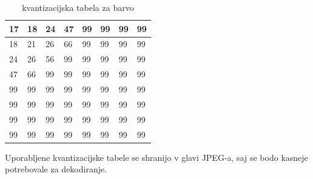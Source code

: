 \documentclass[a4paper,12pt,openright]{book}
\begin{document}
\begin{table}[ht]
\centering
\begin{tabular}{|p{18pt}|p{18pt}|p{18pt}|p{18pt}|p{18pt}|p{18pt}|p{18pt}|p{18pt}|}
\hline
17& 18& 24& 47& 99& 99& 99& 99 \\ \hline
18& 21& 26& 66& 99& 99& 99& 99 \\ \hline
24& 26& 56& 99& 99& 99& 99& 99 \\ \hline
47& 66& 99& 99& 99& 99& 99& 99 \\ \hline
99& 99& 99& 99& 99& 99& 99& 99 \\ \hline
99& 99& 99& 99& 99& 99& 99& 99 \\ \hline
99& 99& 99& 99& 99& 99& 99& 99 \\ \hline
99& 99& 99& 99& 99& 99& 99& 99 \\ \hline
\end{tabular}
\caption{kvantizacijska tabela za barvo}
\label{tab:Kvantizacija_barva}
\end{table}
Uporabljene kvantizacijske tabele se shranijo v glavi JPEG-a, saj se bodo kasneje potrebovale za dekodiranje.\par
\end{document}
